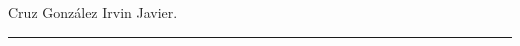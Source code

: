 \documentclass[a4paper,10pt]{article}
\begin{document}
\begin{enumerate}
    \lipsum[1-2]
    
\end{enumerate}
\newpage

\textsf{Cruz González Irvin Javier. \hspace{2.8cm}{Calculo de complejidades}\hspace{4.2cm}{\today}}\\
{\color{cyan} \noindent\rule{19cm}{0.4pt}}\\

\lipsum[2-4]
\end{document}
